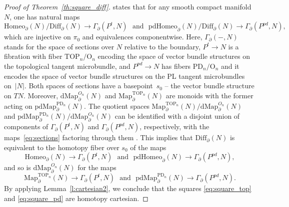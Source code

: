 \documentclass[11pt]{amsart}
\theoremstyle{definition}
\newcommand{\Map}{\mathrm{Map}}
\newcommand{\dMap}{\mathrm{dMap}}
\newcommand{\pdMap}{\mathrm{pdMap}}
\newcommand{\Diff}{\mathrm{Diff}}
\newcommand{\Homeo}{\mathrm{Homeo}}
\newcommand{\pdHomeo}{\mathrm{pdHomeo}}
\newcommand{\TOP}{\mathrm{TOP}}
\newcommand{\OO}{\mathrm{O}}
\newcommand{\PD}{\mathrm{PD}}
\numberwithin{equation}{section}
\begin{document}
\begin{proof}[Proof of Theorem~\ref{th:square_diff}]
\cite[Theorem~4.2]{BL_diff} states that for any smooth compact manifold $N$, one has natural maps 
\begin{equation}\label{eq:sections}
\Homeo_\partial(N)/\Diff_\partial(N)\to \Gamma_\partial(P^t,N) \,\,\text{ and }\,\, \pdHomeo_\partial(N)/\Diff_\partial(N)\to \Gamma_\partial(P^{pd},N),
\end{equation}
which are injective on $\pi_0$ and equivalences componentwise. Here, $\Gamma_\partial(-,N)$ stands for the space of sections over $N$ relative to the boundary, $P^t\to N$ is a fibration with fiber $\TOP_n/\OO_n$ encoding the space of vector bundle structures on the
topological tangent microbundle, and $P^{pd}\to N$ has fibers $\PD_n/\OO_n$ and it encodes the space of vector bundle structures on the PL tangent microbundles on~$|N|$. Both 
spaces of sections have a basepoint~$s_0$ -- the  vector bundle structure on $TN$. Moreover, $\dMap_\partial^{O_n}(N)$ and $\Map_\partial^{\TOP_n}(N)$ are monoids with the former acting
on $\pdMap_\partial^{\PD_n}(N)$. The quotient spaces $\Map_\partial^{\TOP_n}(N)/\dMap_\partial^{O_n}(N)$ and $\pdMap_\partial^{\PD_n}(N)/\dMap_\partial^{O_n}(N)$
can be identified with a disjoint union of components of $\Gamma_\partial(P^t,N)$ and $ \Gamma_\partial(P^{pd},N)$, respectively, with the maps~\eqref{eq:sections} factoring through them
\cite[Proposition~1.4]{BL_diff}. This implies that $\Diff_\partial(N)$ is equivalent to the homotopy fiber over $s_0$ of the maps
\begin{equation}\label{eq:sections2}
\Homeo_\partial(N)\to \Gamma_\partial(P^t,N) \,\,\text{ and }\,\, \pdHomeo_\partial(N)\to \Gamma_\partial(P^{pd},N),
\end{equation}
 and so is 
$\dMap_\partial^{O_n}(N)$ for the maps
\begin{equation}\label{eq:sections3}
\Map_\partial^{\TOP_n}(N)\to \Gamma_\partial(P^t,N) \,\,\text{ and }\,\, \pdMap_\partial^{\PD_n}(N)\to \Gamma_\partial(P^{pd},N).
\end{equation}
By applying Lemma~\ref{l:cartesian2}, we  conclude that the squares \eqref{eq:square_top} and \eqref{eq:square_pd} are homotopy cartesian. 


\end{proof}
\end{document}
